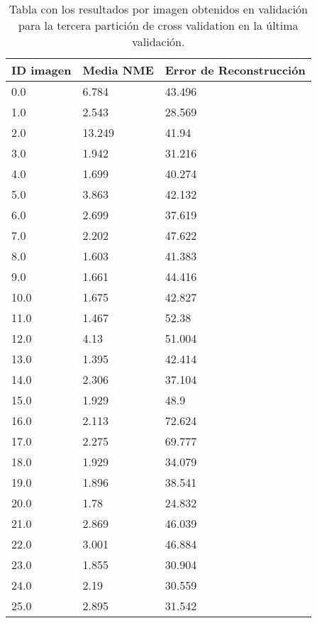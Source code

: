 \begin{table}[!ht]
    \centering
    \caption{Tabla con los resultados por imagen obtenidos en validación para la tercera partición de cross validation en la última validación.}
    \begin{tabular}{|l|l|l|}
    \hline
        ID imagen & Media NME & Error de Reconstrucción \\ \hline
        0.0 & 6.784 & 43.496 \\ \hline
        1.0 & 2.543 & 28.569 \\ \hline
        2.0 & 13.249 & 41.94 \\ \hline
        3.0 & 1.942 & 31.216 \\ \hline
        4.0 & 1.699 & 40.274 \\ \hline
        5.0 & 3.863 & 42.132 \\ \hline
        6.0 & 2.699 & 37.619 \\ \hline
        7.0 & 2.202 & 47.622 \\ \hline
        8.0 & 1.603 & 41.383 \\ \hline
        9.0 & 1.661 & 44.416 \\ \hline
        10.0 & 1.675 & 42.827 \\ \hline
        11.0 & 1.467 & 52.38 \\ \hline
        12.0 & 4.13 & 51.004 \\ \hline
        13.0 & 1.395 & 42.414 \\ \hline
        14.0 & 2.306 & 37.104 \\ \hline
        15.0 & 1.929 & 48.9 \\ \hline
        16.0 & 2.113 & 72.624 \\ \hline
        17.0 & 2.275 & 69.777 \\ \hline
        18.0 & 1.929 & 34.079 \\ \hline
        19.0 & 1.896 & 38.541 \\ \hline
        20.0 & 1.78 & 24.832 \\ \hline
        21.0 & 2.869 & 46.039 \\ \hline
        22.0 & 3.001 & 46.884 \\ \hline
        23.0 & 1.855 & 30.904 \\ \hline
        24.0 & 2.19 & 30.559 \\ \hline
        25.0 & 2.895 & 31.542 \\ \hline
    \end{tabular}
    \label{table:Decoder_images_2}
\end{table}

